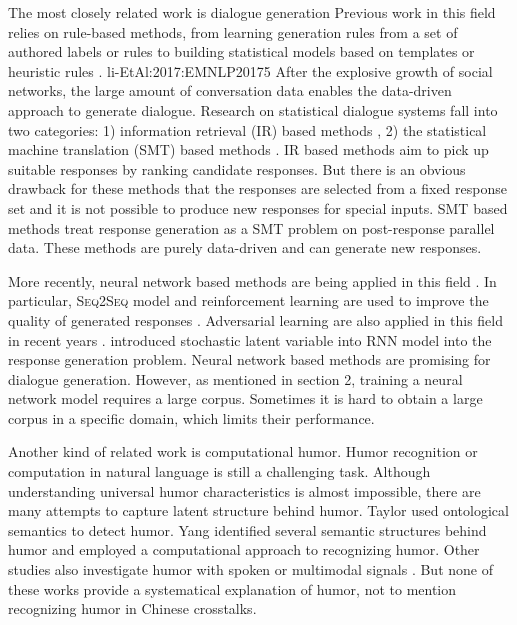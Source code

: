 \documentclass[letterpaper]{article} %
\begin{document}
\begin{CJK*}{UTF8}{gbsn}
The most closely related work is dialogue generation Previous work in this field relies on rule-based methods, from learning generation rules from a set of authored labels or rules \cite{Oh:2000:SLG:1117562.1117568,banchs2012iris}
to building statistical models based on templates or heuristic rules \cite{levin2000stochastic,pieraccini2009we}.  
li-EtAl:2017:EMNLP20175
After the explosive growth of social networks, the large amount of conversation data enables the data-driven approach to generate dialogue. Research on statistical dialogue systems fall into two categories: 1) information retrieval (IR) based methods \cite{ji2014information}, 2) the statistical machine translation (SMT) based methods \cite{ritter2011data}. IR based methods aim to pick up suitable responses by ranking candidate responses. But there is an obvious drawback for these methods that the responses are selected from a fixed response set and it is not possible to produce new responses for special inputs. SMT based methods treat response generation as a SMT problem on post-response parallel data. These methods are purely data-driven and can generate new responses. 

More recently, neural network based methods are being applied in this field \cite{serban2015building,yao2015attention,%
	li-EtAl:2016:EMNLP20162}. In particular, \textsc{Seq2Seq} model and reinforcement learning are used to improve the quality of generated responses \cite{li-EtAl:2016:EMNLP20162}. Adversarial learning are also applied in this field in recent years \cite{li-EtAl:2017:EMNLP20175}. 
	\cite{serban2017hierarchical} introduced stochastic latent variable into RNN model into the response generation problem.
	Neural network based methods are promising for dialogue generation. However, as mentioned in section 2, training a neural network model requires a large corpus. Sometimes it is hard to obtain a large corpus in a specific domain, which limits their performance.

Another kind of related work is computational humor. Humor recognition or computation in natural language is still a challenging task. Although understanding universal humor characteristics is almost impossible, there are many attempts to capture latent structure behind humor. Taylor  used ontological semantics to detect humor. Yang  identified several semantic structures behind humor and employed a computational approach to recognizing humor. Other studies also investigate humor with spoken or multimodal signals \cite{purandare2006humor}. But none of these works provide a systematical explanation of humor, not to mention recognizing humor in Chinese crosstalks. 


\end{CJK*}
\end{document}
